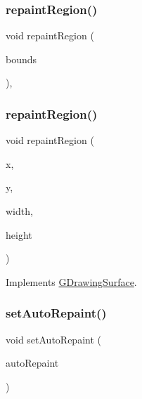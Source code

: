 \subsubsection{\texorpdfstring{repaint\+Region()}{repaintRegion()}\hspace{0.1cm}{\footnotesize\ttfamily [1/2]}}
{\footnotesize\ttfamily void repaint\+Region (\begin{DoxyParamCaption}\item[{const \mbox{\hyperlink{classGRectangle}{G\+Rectangle}} \&}]{bounds }\end{DoxyParamCaption})\hspace{0.3cm}{\ttfamily [virtual]}, {\ttfamily [inherited]}}

\mbox{\label{classGForwardDrawingSurface_a52152a764c4c4b092f826eee5d6554aa}} 
\subsubsection{\texorpdfstring{repaint\+Region()}{repaintRegion()}\hspace{0.1cm}{\footnotesize\ttfamily [2/2]}}
{\footnotesize\ttfamily void repaint\+Region (\begin{DoxyParamCaption}\item[{int}]{x,  }\item[{int}]{y,  }\item[{int}]{width,  }\item[{int}]{height }\end{DoxyParamCaption})\hspace{0.3cm}{\ttfamily [virtual]}}



Implements \mbox{\hyperlink{classGDrawingSurface_a1a3898317080fecf8af21bbeaeeb37c3}{G\+Drawing\+Surface}}.

\mbox{\label{classGForwardDrawingSurface_ade731c276cd0bcd37639280d06571333}} 
\subsubsection{\texorpdfstring{set\+Auto\+Repaint()}{setAutoRepaint()}}
{\footnotesize\ttfamily void set\+Auto\+Repaint (\begin{DoxyParamCaption}\item[{bool}]{auto\+Repaint }\end{DoxyParamCaption})\hspace{0.3cm}{\ttfamily [virtual]}}



